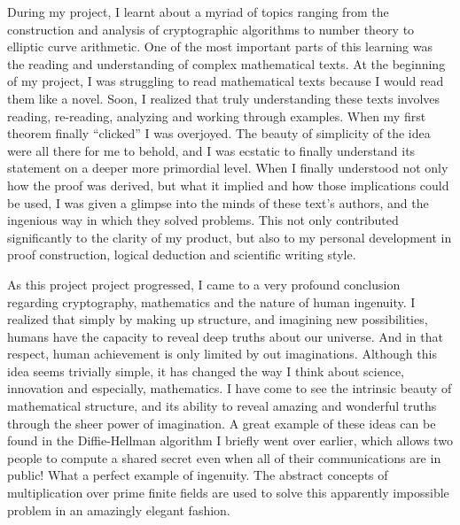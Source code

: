 \documentclass[12pt, a4paper, final]{report}
\begin{document}
During my project, I learnt about a myriad of topics ranging from
the construction and analysis of cryptographic algorithms to number theory
to elliptic curve arithmetic. One of the most important parts of this learning
was the reading and understanding of complex mathematical texts. At the
beginning of my project, I was struggling to read mathematical texts because
I would read them like a novel. Soon, I realized that truly understanding
these texts involves reading, re-reading, analyzing and working through
examples. When my first theorem finally ``clicked'' I was overjoyed. The
beauty of simplicity of the idea were all there for me to behold, and I was
ecstatic to finally understand its statement on a deeper more primordial level.
When I finally understood not only how the proof was derived, but what it
implied and how those implications could be used, I was given a glimpse
into the minds of these text's authors, and the ingenious way in which they
solved problems. This not only contributed significantly to the clarity of my
product, but also to my personal development in proof construction, logical
deduction and scientific writing style.

As this project project progressed, I came to a very profound
conclusion regarding cryptography, mathematics and the nature of
human ingenuity. I realized that simply by making up structure, and
imagining new possibilities, humans have the capacity to reveal
deep truths about our universe. And in that respect, human achievement
is only limited by out imaginations. Although this idea seems trivially
simple, it has changed the way I think about science, innovation and
especially, mathematics. I have come to see the intrinsic beauty of
mathematical structure, and its ability to reveal amazing and wonderful
truths through the sheer power of imagination. A great example of these ideas
can be found in the Diffie-Hellman algorithm I briefly went over earlier,
which allows two people to compute a shared secret even when all of their
communications are in public! What a perfect example of ingenuity. The
abstract concepts of multiplication over prime finite fields are used
to solve this apparently impossible problem in an amazingly elegant fashion.
\end{document}
